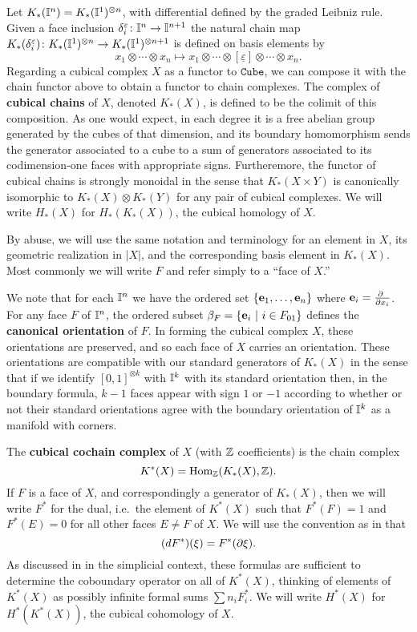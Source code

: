 Let $K_*(\mathbb{I}^n) = K_*(\mathbb{I}^1)^{ \otimes n}$, with differential defined by the graded Leibniz rule.
Given a face inclusion $\delta_i^{\varepsilon} \colon \mathbb{I}^n \to \mathbb{I}^{n+1}$ the natural chain map $K_*(\delta_i^{\varepsilon}) \colon K_*(\mathbb{I}^1)^{ \otimes n} \to K_*(\mathbb{I}^1)^{ \otimes n+1}$ is defined on basis elements by
\begin{equation*}
	x_1 \otimes \cdots \otimes x_n \mapsto
	x_1 \otimes \cdots \otimes [\underline{\varepsilon}] \otimes \cdots \otimes x_n.
\end{equation*}
Regarding a cubical complex $X$ as a functor to $\mathtt{Cube}$, we can compose it with the chain functor above to obtain a functor to chain complexes.
The complex of \textbf{cubical chains} of $X$, denoted $K_*(X)$, is defined to be the colimit of this composition.
As one would expect, in each degree it is a free abelian group generated by the cubes of that dimension, and its boundary homomorphism sends the
generator associated to a cube to a sum of generators associated to its codimension-one faces with appropriate signs.
Furtheremore, the functor of cubical chains is strongly monoidal in the sense that $K_*(X \times Y)$ is canonically isomorphic to $K_*(X) \otimes K_*(Y)$ for any pair of cubical complexes.
We will write $H_*(X)$ for $H_*(K_*(X))$, the cubical homology of $X$.

By abuse, we will use the same notation and terminology for an element in $X$, its geometric realization in $|X|$,
and the corresponding basis element in $K_*(X)$.
Most commonly we will write $F$ and refer simply to a ``face of $X$.''

We note that for each $\mathbb{I}^n$ we have the ordered set $\{\mathbf{e}_1, \dots, \mathbf{e}_n\}$ where $\mathbf{e}_i = \frac{\partial\ }{\partial x_i}$.
For any face $F$ of $\mathbb{I}^n$, the ordered subset $\beta_F = \{\mathbf{e}_i\ |\ i \in F_{01}\}$ defines the \textbf{canonical orientation} of $F$.
In forming the cubical complex $X$, these orientations are preserved, and so each face of $X$ carries an orientation.
These orientations are compatible with our standard generators of $K_*(X)$ in the sense that if we identify $[0,1]^{ \otimes k}$ with $\mathbb{I}^k$ with its standard orientation then, in the boundary formula, $k-1$ faces appear with sign $1$ or $-1$ according to whether or not their standard orientations agree with the boundary orientation of $\mathbb{I}^k$ as a manifold with corners.

The \textbf{cubical cochain complex} of $X$ (with $\mathbb{Z}$ coefficients) is the chain complex
\[
K^*(X) = \textup{Hom}_{\mathbb{Z}}(K_*(X), \mathbb{Z}).
\]
If $F$ is a face of $X$, and correspondingly a generator of $K_*(X)$, then we will write $F^*$ for the dual, i.e.\ the element of $K^*(X)$ such that $F^*(F) = 1$ and $F^*(E) = 0$ for all other faces $E\neq F$ of $X$.
We will use the convention as in \cite[Section 42]{Mun84} that
$$(dF^*)(\xi) = F^*(\partial \xi).$$
As discussed in \cite[Section 42]{Mun84} in the simplicial context, these formulas are sufficient to determine the coboundary operator on all of $K^*(X)$, thinking of elements of $K^*(X)$ as possibly infinite formal sums $\sum n_i F_i^*$.
We will write $H^*(X)$ for $H^*(K^*(X))$, the cubical cohomology of $X$.

